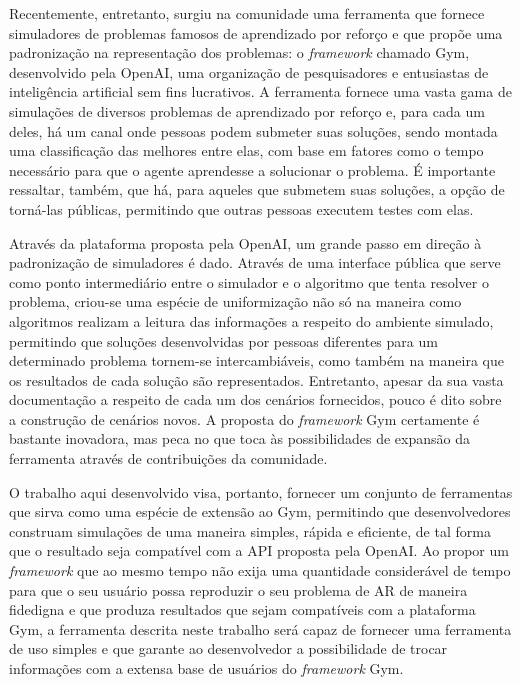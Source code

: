 \documentclass[cic,tc]{iiufrgs}
\begin{document}
Recentemente, entretanto, surgiu na comunidade uma ferramenta que fornece
simuladores de problemas famosos de aprendizado por reforço e que propõe uma
padronização na representação dos problemas: o \textit{framework} chamado Gym,
desenvolvido pela OpenAI, uma organização de pesquisadores e entusiastas
de inteligência artificial sem fins lucrativos. A ferramenta fornece uma vasta
gama de simulações de diversos problemas de aprendizado por reforço e, para
cada um deles, há um canal onde pessoas podem submeter suas soluções, sendo
montada uma classificação das melhores entre elas, com base em fatores como
o tempo necessário para que o agente aprendesse a solucionar o problema. É
importante ressaltar, também, que há, para aqueles que submetem suas soluções,
a opção de torná-las públicas, permitindo que outras pessoas executem testes
com elas.


Através da plataforma proposta pela OpenAI, um grande passo em direção à
padronização de simuladores é dado. Através de uma interface pública
que serve como ponto
intermediário entre o simulador e o algoritmo que tenta resolver o problema,
criou-se uma espécie de uniformização não só na maneira como algoritmos
realizam a leitura das informações a respeito do ambiente simulado, permitindo que
soluções desenvolvidas por pessoas diferentes para um determinado problema
tornem-se intercambiáveis, como também na maneira que os resultados de cada
solução são representados. Entretanto, apesar da sua vasta documentação
a respeito de cada um dos cenários fornecidos, pouco é dito sobre a construção
de cenários novos. A proposta do \textit{framework} Gym certamente é
bastante inovadora, mas peca no que toca às possibilidades de expansão da
ferramenta através de contribuições da comunidade.


O trabalho aqui desenvolvido visa, portanto, fornecer um conjunto de ferramentas
que sirva como uma espécie de extensão ao Gym, permitindo que desenvolvedores
construam simulações de uma maneira simples, rápida e eficiente, de tal forma
que o resultado seja compatível com a API proposta pela OpenAI. Ao propor um
\textit{framework} que ao mesmo tempo não exija uma quantidade considerável
de tempo para que o seu usuário possa reproduzir o seu problema de AR de
maneira fidedigna e que produza resultados que sejam compatíveis com a
plataforma Gym, a ferramenta descrita neste trabalho será capaz de fornecer uma
ferramenta de uso simples e que garante ao desenvolvedor a possibilidade de
trocar informações com a extensa base de usuários do \textit{framework} Gym.
\end{document}
